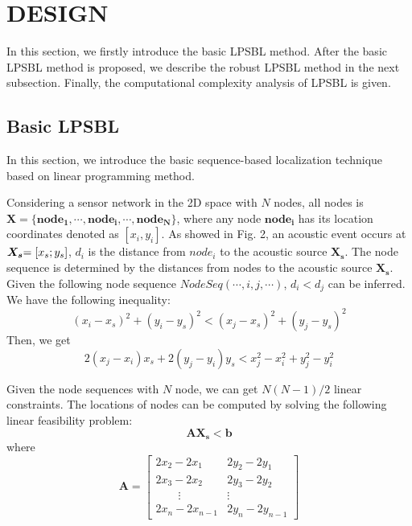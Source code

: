 
\section{DESIGN}

In this section, we firstly introduce the basic LPSBL method.
After the basic LPSBL method is proposed, we describe the robust LPSBL method in the next subsection.
Finally, the computational complexity analysis of LPSBL is given.

\subsection{Basic LPSBL}

In this section, we introduce the basic sequence-based localization technique based on linear programming method.

Considering a sensor network in the 2D space with $N$ nodes, all nodes is $\bm{X} = \{ \bm{nod{e_1}}, \cdots ,\bm{nod{e_i}}, \cdots ,\bm{nod{e_N}}\}$, 
where any node $\bm{nod{e_i}}$ has its location coordinates denoted as $[{x_i},{y_i}]$. 
As showed in Fig. 2, an acoustic event occurs at $\bm{X_s}{\rm{ = [}}{x_s};{y_s}]$, ${d_i}$ is the distance from $nod{e_i}$ to the acoustic source $\bm{X_s}$.
The node sequence is determined by the distances from nodes to the acoustic source $\bm{X_s}$.
Given the following node sequence $NodeSeq( \cdots ,i,j, \cdots )$, ${d_i}<{d_j}$ can be inferred. We have the following inequality:
 \begin{equation} \label{equation_1}
(x_i-x_s)^2+(y_i-y_s)^2 < (x_j-x_s)^2+(y_j-y_s)^2
 \end{equation}
Then, we get
\begin{equation} \label{equation_2}
2(x_j-x_i)x_s+2(y_j-y_i)y_s<x_j^2-x_i^2+y_j^2-y_i^2
\end{equation}

Given the node sequences with $N$ node, we can get $N(N - 1)/2$ linear constraints. The
locations of nodes can be computed by solving the following linear feasibility problem:
\begin{equation}
\bm {{A}{X_s}}< \bm{{b}}
\end{equation}
where
\[\bm{A} = 
\left[
\begin{array}{lcr}
2x_2-2x_1 & 2y_2-2y_1 \\
2x_3-2x_2 & 2y_3-2y_2 \\
\quad  \quad      \vdots  &   \vdots  \\
2x_n-2x_{n-1} & 2y_n-2y_{n-1}
\end{array}
\right]
\]

